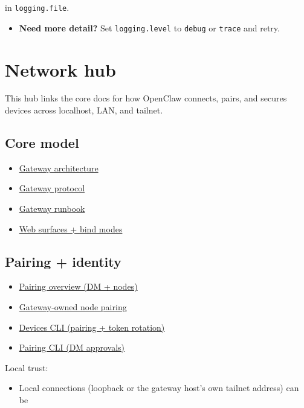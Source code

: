 in \texttt{logging.file}.
\begin{itemize}
  \item \textbf{Need more detail?} Set \texttt{logging.level} to \texttt{debug} or \texttt{trace} and retry.
\end{itemize}



\clearpage

\section{Network hub}


This hub links the core docs for how OpenClaw connects, pairs, and secures
devices across localhost, LAN, and tailnet.

\subsection{Core model}


\begin{itemize}
  \item \href{/concepts/architecture}{Gateway architecture}
  \item \href{/gateway/protocol}{Gateway protocol}
  \item \href{/gateway}{Gateway runbook}
  \item \href{/web}{Web surfaces + bind modes}
\end{itemize}


\subsection{Pairing + identity}


\begin{itemize}
  \item \href{/channels/pairing}{Pairing overview (DM + nodes)}
  \item \href{/gateway/pairing}{Gateway-owned node pairing}
  \item \href{/cli/devices}{Devices CLI (pairing + token rotation)}
  \item \href{/cli/pairing}{Pairing CLI (DM approvals)}
\end{itemize}


Local trust:

\begin{itemize}
  \item Local connections (loopback or the gateway host’s own tailnet address) can be
\end{itemize}

